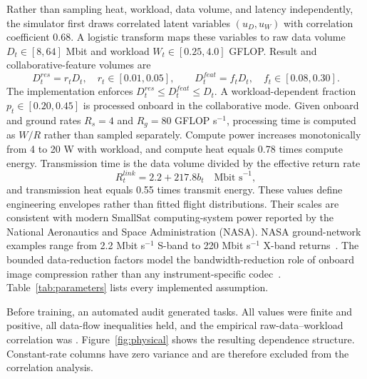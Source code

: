 \documentclass[remotesensing,article,submit,moreauthors]{Definitions/mdpi}
\begin{document}
Rather than sampling heat, workload, data volume, and latency independently, the simulator first draws correlated latent variables $(u_D,u_W)$ with correlation coefficient 0.68. A logistic transform maps these variables to raw data volume $D_t\in[8,64]$ Mbit and workload $W_t\in[0.25,4.0]$ GFLOP. Result and collaborative-feature volumes are
\begin{equation}
D_t^{res}=r_tD_t,\quad r_t\in[0.01,0.05],\qquad
D_t^{feat}=f_tD_t,\quad f_t\in[0.08,0.30].
\end{equation}
The implementation enforces $D_t^{res}\le D_t^{feat}\le D_t$. A workload-dependent fraction $p_t\in[0.20,0.45]$ is processed onboard in the collaborative mode. Given onboard and ground rates $R_s=4$ and $R_g=80$ GFLOP s$^{-1}$, processing time is computed as $W/R$ rather than sampled separately. Compute power increases monotonically from 4 to 20 W with workload, and compute heat equals 0.78 times compute energy. Transmission time is the data volume divided by the effective return rate
\begin{equation}
R_t^{link}=2.2+217.8b_t\quad\text{Mbit s}^{-1},
\end{equation}
and transmission heat equals 0.55 times transmit energy. These values define engineering envelopes rather than fitted flight distributions. Their scales are consistent with modern SmallSat computing-system power reported by the National Aeronautics and Space Administration (NASA). NASA ground-network examples range from 2.2 Mbit s$^{-1}$ S-band to 220 Mbit s$^{-1}$ X-band returns~\cite{nasa2026avionics,nasa2026ground}. The bounded data-reduction factors model the bandwidth-reduction role of onboard image compression rather than any instrument-specific codec~\cite{ccsds122}. Table~\ref{tab:parameters} lists every implemented assumption.

\begin{table}[H]
\centering
\caption{Modeled engineering primitives and provenance of the current simulator. Values define a transparent synthetic envelope; they are not presented as a fitted flight distribution.}
\label{tab:parameters}
\resizebox{\textwidth}{!}{}
\end{table}

Before training, an automated audit generated \PhysicalAuditTasks{} tasks. All values were finite and positive, all data-flow inequalities held, and the empirical raw-data--workload correlation was \PhysicalCorrDataWork. Figure~\ref{fig:physical} shows the resulting dependence structure. Constant-rate columns have zero variance and are therefore excluded from the correlation analysis.
\end{document}
